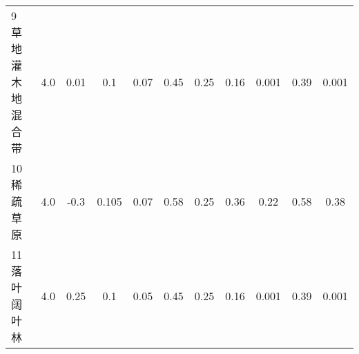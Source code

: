 \begin{sidewaystable}[]
\begin{tabular}{@{}lcccccccccc@{}}
    9 草地灌木地混合带     & 4.0        & 0.01                                                                         & 0.1                                                                                                             & 0.07                                                                                                            & 0.45                                                                                                            & 0.25                                                                                                            & 0.16                                                                                                            & 0.001                                                                                                           & 0.39                                                                                                            & 0.001                                                                                                           \\
    10 稀疏草原        & 4.0        & -0.3                                                                         & 0.105                                                                                                           & 0.07                                                                                                            & 0.58                                                                                                            & 0.25                                                                                                            & 0.36                                                                                                            & 0.22                                                                                                            & 0.58                                                                                                            & 0.38                                                                                                            \\
    11 落叶阔叶林       & 4.0        & 0.25                                                                         & 0.1                                                                                                             & 0.05                                                                                                            & 0.45                                                                                                            & 0.25                                                                                                            & 0.16                                                                                                            & 0.001                                                                                                           & 0.39                                                                                                            & 0.001                                                                                                           \\

\end{tabular}
\end{sidewaystable}
